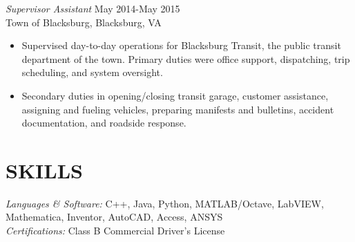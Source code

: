 \documentclass[margin]{res}
\begin{document}
\begin{resume}
                {\sl Supervisor Assistant} \hfill          May 2014-May 2015 \\
                 Town of Blacksburg, Blacksburg, VA
                 \begin{itemize}  \itemsep -2pt %
                 \item Supervised day-to-day operations for Blacksburg Transit, the public transit department of the town. Primary duties were office support, dispatching, trip scheduling, and system oversight.
                 \item Secondary duties in opening/closing transit garage, customer assistance, assigning and fueling vehicles, preparing manifests and bulletins, accident documentation, and roadside response.
                 \end{itemize} 
 
 
\section{SKILLS} {\sl Languages \& Software:} C++, Java, Python, MATLAB/Octave, LabVIEW, Mathematica, Inventor, AutoCAD,
	      Access, ANSYS \\
               {\sl Certifications:} Class B Commercial Driver's License
 



\end{resume}
\end{document}
